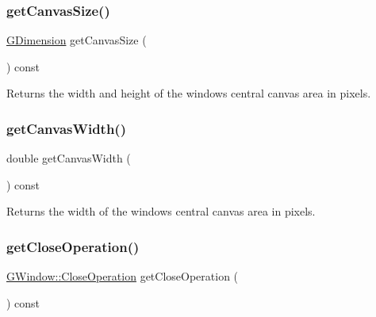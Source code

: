 \subsubsection{\texorpdfstring{get\+Canvas\+Size()}{getCanvasSize()}}
{\footnotesize\ttfamily \mbox{\hyperlink{structGDimension}{G\+Dimension}} get\+Canvas\+Size (\begin{DoxyParamCaption}{ }\end{DoxyParamCaption}) const\hspace{0.3cm}{\ttfamily [virtual]}}



Returns the width and height of the window\textquotesingle{}s central canvas area in pixels. 

\mbox{\label{classGWindow_a82ed6884fd4b0257a825e786236c2428}} 
\subsubsection{\texorpdfstring{get\+Canvas\+Width()}{getCanvasWidth()}}
{\footnotesize\ttfamily double get\+Canvas\+Width (\begin{DoxyParamCaption}{ }\end{DoxyParamCaption}) const\hspace{0.3cm}{\ttfamily [virtual]}}



Returns the width of the window\textquotesingle{}s central canvas area in pixels. 

\mbox{\label{classGWindow_a733b18ceeceb7ab98da8c4ac9a8d2857}} 
\subsubsection{\texorpdfstring{get\+Close\+Operation()}{getCloseOperation()}}
{\footnotesize\ttfamily \mbox{\hyperlink{classGWindow_a84803201f0f9569db61f51cac9e0d2d2}{G\+Window\+::\+Close\+Operation}} get\+Close\+Operation (\begin{DoxyParamCaption}{ }\end{DoxyParamCaption}) const\hspace{0.3cm}{\ttfamily [virtual]}}



